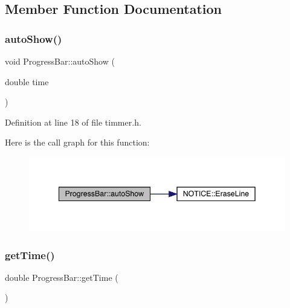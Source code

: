 \subsection{Member Function Documentation}
\mbox{\label{class_progress_bar_abcd6f66c18eb0dca5fa42ebfff03a11e}} 
\subsubsection{\texorpdfstring{auto\+Show()}{autoShow()}}
{\footnotesize\ttfamily void Progress\+Bar\+::auto\+Show (\begin{DoxyParamCaption}\item[{double}]{time }\end{DoxyParamCaption})\hspace{0.3cm}{\ttfamily [inline]}}



Definition at line 18 of file timmer.\+h.

Here is the call graph for this function\+:\nopagebreak
\begin{figure}[H]
\begin{center}
\leavevmode
\includegraphics[width=342pt]{class_progress_bar_abcd6f66c18eb0dca5fa42ebfff03a11e_cgraph}
\end{center}
\end{figure}
\mbox{\label{class_progress_bar_abcca17e287cdae4b0752e3c7a6428d91}} 
\subsubsection{\texorpdfstring{get\+Time()}{getTime()}}
{\footnotesize\ttfamily double Progress\+Bar\+::get\+Time (\begin{DoxyParamCaption}{ }\end{DoxyParamCaption})\hspace{0.3cm}{\ttfamily [inline]}}



